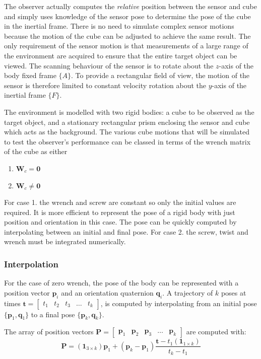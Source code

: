 The observer actually computes the \textit{relative} position between the sensor and cube and simply uses knowledge of the sensor pose to determine the pose of the cube in the inertial frame. There is no need to simulate complex sensor motions because the motion of the cube can be adjusted to achieve the same result. The only requirement of the sensor motion is that measurements of a large range of the environment are acquired to ensure that the entire target object can be viewed. The scanning behaviour of the sensor is to rotate about the $z$-axis of the body fixed frame $\{A\}$. To provide a rectangular field of view, the motion of the sensor is therefore limited to constant velocity rotation about the $y$-axis of the inertial frame $\{F\}$.

The environment is modelled with two rigid bodies: a cube to be observed as the target object, and a stationary rectangular prism enclosing the sensor and cube which acts as the background. The various cube motions that will be simulated to test the observer's performance can be classed in terms of the wrench matrix of the cube as either
\begin{enumerate}
\item ${\textbf{W}_c} = \textbf{0}$
\item ${\textbf{W}_c} \neq \textbf{0}$
\end{enumerate}

For case 1. the wrench and screw are constant so only the initial values are required. It is more efficient to represent the pose of a rigid body with just position and orientation in this case. The pose can be quickly computed by interpolating between an initial and final pose. For case 2. the screw, twist and wrench must be integrated numerically.

\subsubsection{Interpolation}
For the case of zero wrench, the pose of the body can be represented with a position vector $\mathbf{p}_i$ and an orientation quaternion $\mathbf{q}_i$. A trajectory of $k$ poses at times 
$\mathbf{t} =
\begin{bmatrix}
	t_1 & t_2 & t_3 & \dots & t_k
\end{bmatrix}$,
is computed by interpolating from an initial pose $\{\mathbf{p}_1,\mathbf{q}_1\}$ to a final pose $\{\mathbf{p}_k,\mathbf{q}_k\}$.

The array of position vectors
$\mathbf{P}= \begin{bmatrix}
\mathbf{p}_1 & \mathbf{p}_2 & \mathbf{p}_3 & \dots & \mathbf{p}_k
\end{bmatrix}$
 are computed with:
\begin{equation}
	\mathbf{P} = 
	(\mathbf{1}_{3 \times k}){\mathbf{p}_1} + (\mathbf{p}_k - \mathbf{p}_1)\frac{\mathbf{t}-{t_1}(\mathbf{1}_{1 \times k})}{t_k - t_1}
\end{equation}

